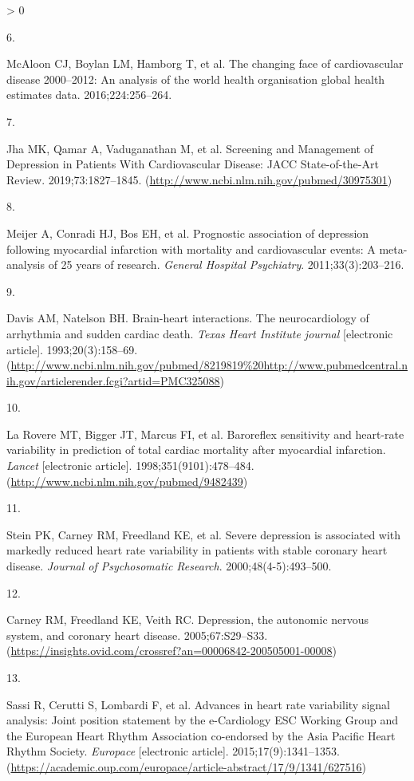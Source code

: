 \documentclass[
  11pt,
  openany]{book}
\newlength{\cslhangindent}
\newlength{\csllabelwidth}
\newenvironment{CSLReferences}[2] %
 {%
  \setlength{\parindent}{0pt}
  \ifodd #1 \everypar{\setlength{\hangindent}{\cslhangindent}}\ignorespaces\fi
  \ifnum #2 > 0
  \setlength{\parskip}{#2\baselineskip}
  \fi
 }%
 {}
\newcommand{\CSLLeftMargin}[1]{\parbox[t]{\csllabelwidth}{#1}}
\newcommand{\CSLRightInline}[1]{\parbox[t]{\linewidth - \csllabelwidth}{#1}\break}
\begin{document}
\begin{CSLReferences}{0}{0}
\leavevmode\hypertarget{ref-McAloon2016b}{}%
\CSLLeftMargin{6. }
\CSLRightInline{McAloon CJ, Boylan LM, Hamborg T, et al. {The changing face of cardiovascular disease 2000--2012: An analysis of the world health organisation global health estimates data}. 2016;224:256--264. }

\leavevmode\hypertarget{ref-Jha2019}{}%
\CSLLeftMargin{7. }
\CSLRightInline{Jha MK, Qamar A, Vaduganathan M, et al. {Screening and Management of Depression in Patients With Cardiovascular Disease: JACC State-of-the-Art Review}. 2019;73:1827--1845. (\url{http://www.ncbi.nlm.nih.gov/pubmed/30975301})}

\leavevmode\hypertarget{ref-Meijer2011}{}%
\CSLLeftMargin{8. }
\CSLRightInline{Meijer A, Conradi HJ, Bos EH, et al. {Prognostic association of depression following myocardial infarction with mortality and cardiovascular events: A meta-analysis of 25 years of research}. \emph{General Hospital Psychiatry}. 2011;33(3):203--216. }

\leavevmode\hypertarget{ref-Davis1993}{}%
\CSLLeftMargin{9. }
\CSLRightInline{Davis AM, Natelson BH. {Brain-heart interactions. The neurocardiology of arrhythmia and sudden cardiac death.} \emph{Texas Heart Institute journal} {[}electronic article{]}. 1993;20(3):158--69. (\url{http://www.ncbi.nlm.nih.gov/pubmed/8219819\%20http://www.pubmedcentral.nih.gov/articlerender.fcgi?artid=PMC325088})}

\leavevmode\hypertarget{ref-LaRovere1998}{}%
\CSLLeftMargin{10. }
\CSLRightInline{La Rovere MT, Bigger JT, Marcus FI, et al. {Baroreflex sensitivity and heart-rate variability in prediction of total cardiac mortality after myocardial infarction}. \emph{Lancet} {[}electronic article{]}. 1998;351(9101):478--484. (\url{http://www.ncbi.nlm.nih.gov/pubmed/9482439})}

\leavevmode\hypertarget{ref-Stein2000}{}%
\CSLLeftMargin{11. }
\CSLRightInline{Stein PK, Carney RM, Freedland KE, et al. {Severe depression is associated with markedly reduced heart rate variability in patients with stable coronary heart disease}. \emph{Journal of Psychosomatic Research}. 2000;48(4-5):493--500. }

\leavevmode\hypertarget{ref-Carney2005}{}%
\CSLLeftMargin{12. }
\CSLRightInline{Carney RM, Freedland KE, Veith RC. {Depression, the autonomic nervous system, and coronary heart disease}. 2005;67:S29--S33. (\url{https://insights.ovid.com/crossref?an=00006842-200505001-00008})}

\leavevmode\hypertarget{ref-Sassi2015}{}%
\CSLLeftMargin{13. }
\CSLRightInline{Sassi R, Cerutti S, Lombardi F, et al. {Advances in heart rate variability signal analysis: Joint position statement by the e-Cardiology ESC Working Group and the European Heart Rhythm Association co-endorsed by the Asia Pacific Heart Rhythm Society}. \emph{Europace} {[}electronic article{]}. 2015;17(9):1341--1353. (\url{https://academic.oup.com/europace/article-abstract/17/9/1341/627516})}


\end{CSLReferences}
\end{document}
